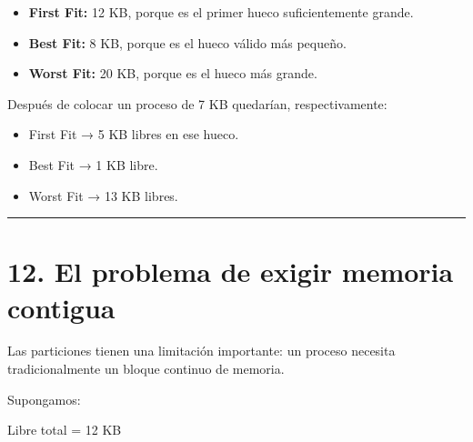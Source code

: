 \documentclass[
  spanish,
  letterpaper,
]{scrbook}
\newenvironment{Shaded}{\begin{snugshade}}{\end{snugshade}}
\newcommand{\NormalTok}[1]{\textcolor[rgb]{0.00,0.23,0.31}{#1}}
\providecommand{\tightlist}{%
  \setlength{\itemsep}{0pt}\setlength{\parskip}{0pt}}
\begin{document}
\begin{tcolorbox}[enhanced jigsaw, arc=.35mm, bottomrule=.15mm, bottomtitle=1mm, breakable, colback=white, colbacktitle=quarto-callout-tip-color!10!white, colframe=quarto-callout-tip-color-frame, coltitle=black, left=2mm, leftrule=.75mm, opacityback=0, opacitybacktitle=0.6, rightrule=.15mm, title=\textcolor{quarto-callout-tip-color}{\faLightbulb}\hspace{0.5em}{✅ Solución propuesta}, titlerule=0mm, toprule=.15mm, toptitle=1mm]

\begin{itemize}
\tightlist
\item
  \textbf{First Fit:} 12 KB, porque es el primer hueco suficientemente
  grande.
\item
  \textbf{Best Fit:} 8 KB, porque es el hueco válido más pequeño.
\item
  \textbf{Worst Fit:} 20 KB, porque es el hueco más grande.
\end{itemize}

Después de colocar un proceso de 7 KB quedarían, respectivamente:

\begin{itemize}
\tightlist
\item
  First Fit → 5 KB libres en ese hueco.
\item
  Best Fit → 1 KB libre.
\item
  Worst Fit → 13 KB libres.
\end{itemize}

\end{tcolorbox}

\begin{center}\rule{0.5\linewidth}{0.5pt}\end{center}


\chapter{12. El problema de exigir memoria
contigua}\label{el-problema-de-exigir-memoria-contigua}

Las particiones tienen una limitación importante: un proceso necesita
tradicionalmente un bloque continuo de memoria.

Supongamos:

\begin{Shaded}
\begin{Highlighting}[]
\NormalTok{Libre total = 12 KB}
\end{Highlighting}
\end{Shaded}
\end{document}
